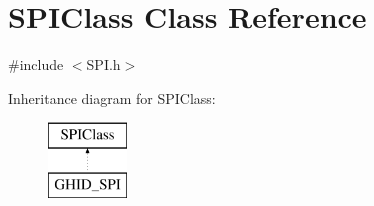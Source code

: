 \hypertarget{class_s_p_i_class}{\section{\-S\-P\-I\-Class \-Class \-Reference}
\label{class_s_p_i_class}
}


{\ttfamily \#include $<$\-S\-P\-I.\-h$>$}

\-Inheritance diagram for \-S\-P\-I\-Class\-:\begin{figure}[H]
\begin{center}
\leavevmode
\includegraphics[height=2.000000cm]{class_s_p_i_class}
\end{center}
\end{figure}
